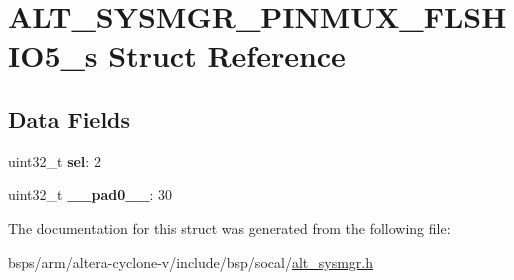 \hypertarget{structALT__SYSMGR__PINMUX__FLSHIO5__s}{}\section{A\+L\+T\+\_\+\+S\+Y\+S\+M\+G\+R\+\_\+\+P\+I\+N\+M\+U\+X\+\_\+\+F\+L\+S\+H\+I\+O5\+\_\+s Struct Reference}
\label{structALT__SYSMGR__PINMUX__FLSHIO5__s}
\subsection*{Data Fields}
\begin{DoxyCompactItemize}
\item 
\mbox{\label{structALT__SYSMGR__PINMUX__FLSHIO5__s_ae0f8f35983796fe52a2c16d384f3e6f9}} 
uint32\+\_\+t {\bfseries sel}\+: 2
\item 
\mbox{\label{structALT__SYSMGR__PINMUX__FLSHIO5__s_a0675d60f87d599cbe03bab9856d6fc2e}} 
uint32\+\_\+t {\bfseries \+\_\+\+\_\+pad0\+\_\+\+\_\+}\+: 30
\end{DoxyCompactItemize}


The documentation for this struct was generated from the following file\+:\begin{DoxyCompactItemize}
\item 
bsps/arm/altera-\/cyclone-\/v/include/bsp/socal/\mbox{\hyperlink{alt__sysmgr_8h}{alt\+\_\+sysmgr.\+h}}\end{DoxyCompactItemize}
